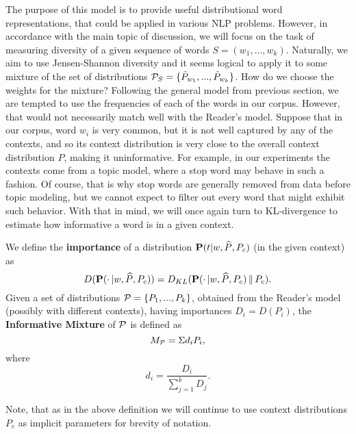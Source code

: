 The purpose of this model is to provide useful distributional
word representations, that could be applied in various NLP
problems. However, in accordance with the main topic of discussion, we will
focus on the task of measuring diversity of a given sequence of words
$S=(w_1,...,w_k)$. Naturally, we aim to use Jensen-Shannon diversity
and it seems logical to apply it to some mixture of the set of
distributions ${\mathcal P}_S=\{\tilde{P}_{w_1},...,\tilde{P}_{w_k}\}$. How do we choose the weights
for the mixture? Following the general model from previous section, we
are tempted to use the frequencies of each of the words in our
corpus. However, that would not  
necessarily match well with the Reader's model. Suppose that in our
corpus, word $w_i$ is very common, but it is not well captured by any of
the contexts, and so its context distribution is very close to the overall
context distribution $P$, making it uninformative. For example, in our
experiments the contexts come from a topic model, where a stop word may
behave in such a fashion. Of course, that is why stop words are
generally removed from data before topic modeling, but we cannot
expect to filter out every word that might exhibit such behavior. With
that in mind, we will once again turn to KL-divergence to
estimate how informative a word is in a given context.

\bed\label{mixture}
We define the {\bf importance} of a distribution $\operatorname{\mathbf{P}}(t|w,\widehat{P},P_c)$ (in 
the given context) as
\[D(\operatorname{\mathbf{P}}(\cdot\,|w,\widehat{P},P_c)) =
D_{KL}(\operatorname{\mathbf{P}}(\cdot\,|w,\widehat{P},P_c)\,\|\,P_c).\]
Given a set of distributions ${\mathcal P} = \{P_1,...,P_k\}$, obtained from the
Reader's model (possibly with different contexts), having importances
$D_i=D(P_i)$, the {\bf Informative Mixture} of ${\mathcal P}$ is defined as
\[M_{{\mathcal P}} = \Sigma d_i P_i,\]
where
\[d_i = \frac{D_i}{\sum_{j=1}^k D_j}.\]
\eed

Note, that as in the above definition we will continue to use context
distributions $P_c$ as implicit parameters for brevity of notation.  

